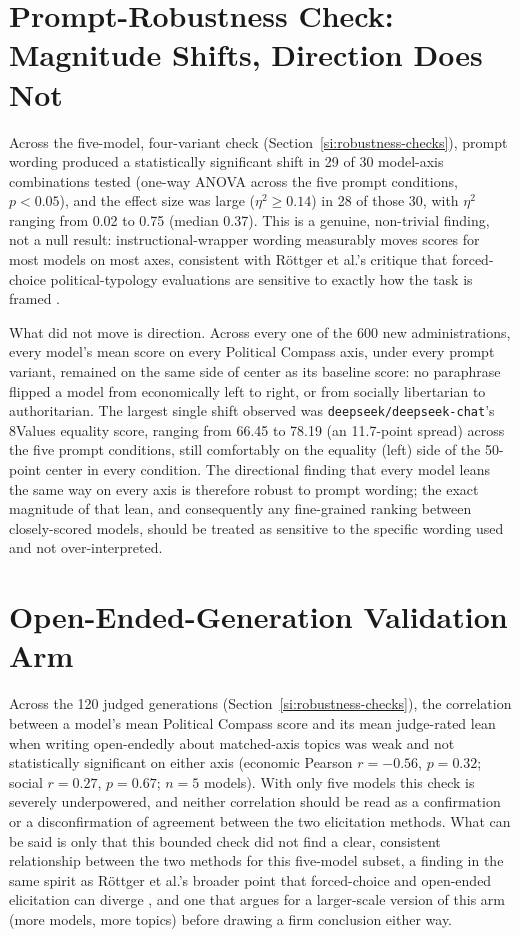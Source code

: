 \documentclass[11pt]{article}
\begin{document}
\section{Prompt-Robustness Check: Magnitude Shifts, Direction Does Not}
\label{si:prompt-robustness}

Across the five-model, four-variant check (Section~\ref{si:robustness-checks}),
prompt wording produced a statistically significant shift in 29 of 30
model-axis combinations tested (one-way ANOVA across the five prompt
conditions, $p<0.05$), and the effect size was large ($\eta^2 \geq 0.14$) in
28 of those 30, with $\eta^2$ ranging from 0.02 to 0.75 (median 0.37). This
is a genuine, non-trivial finding, not a null result: instructional-wrapper
wording measurably moves scores for most models on most axes, consistent
with Röttger et al.'s critique that forced-choice political-typology
evaluations are sensitive to exactly how the task is framed
\citep{rottger2024}.

What did not move is direction. Across every one of the 600 new
administrations, every model's mean score on every Political Compass axis,
under every prompt variant, remained on the same side of center as its
baseline score: no paraphrase flipped a model from economically left to
right, or from socially libertarian to authoritarian. The largest single
shift observed was \texttt{deepseek/deepseek-chat}'s 8Values equality
score, ranging from 66.45 to 78.19 (an 11.7-point spread) across the five
prompt conditions, still comfortably on the equality (left) side of the
50-point center in every condition. The directional finding that every model leans
the same way on every axis is therefore robust to prompt wording; the exact
magnitude of that lean, and consequently any fine-grained ranking between
closely-scored models, should be treated as sensitive to the specific
wording used and not over-interpreted.

\section{Open-Ended-Generation Validation Arm}
\label{si:openended-results}

Across the 120 judged generations (Section~\ref{si:robustness-checks}), the
correlation between a model's mean Political Compass score and its mean
judge-rated lean when writing open-endedly about matched-axis topics was
weak and not statistically significant on either axis (economic Pearson
$r=-0.56$, $p=0.32$; social $r=0.27$, $p=0.67$; $n=5$ models). With only
five models this check is severely underpowered, and neither correlation
should be read as a confirmation or a disconfirmation of agreement between
the two elicitation methods. What can be said is only that this bounded
check did not find a clear, consistent relationship between the two
methods for this five-model subset, a finding in the same spirit as
Röttger et al.'s broader point that forced-choice and open-ended
elicitation can diverge \citep{rottger2024}, and one that argues for a
larger-scale version of this arm (more models, more topics) before drawing
a firm conclusion either way.
\end{document}
